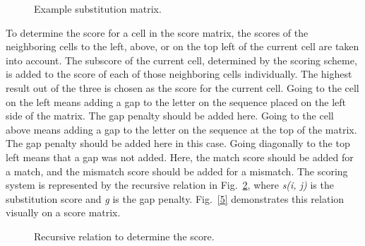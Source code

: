 \documentclass[conference]{IEEEtran}
\begin{document}
\begin{figure}[htbp]
\centerline{}
\caption{Example substitution matrix. \cite{vladimir}}
\label{3}
\end{figure}

To determine the score for a cell in the score matrix, the scores of the neighboring cells to the left, above, or on the top left of the current cell are taken into account. The subscore of the current cell, determined by the scoring scheme, is added to the score of each of those neighboring cells individually. The highest result out of the three is chosen as the score for the current cell. Going to the cell on the left means adding a gap to the letter on the sequence placed on the left side of the matrix. The gap penalty should be added here. Going to the cell above means adding a gap to the letter on the sequence at the top of the matrix. The gap penalty should be added here in this case. Going diagonally to the top left means that a gap was not added. Here, the match score should be added for a match, and the mismatch score should be added for a mismatch. The scoring system is represented by the recursive relation in Fig.~\ref{4}, where \textit{s(i, j)} is the substitution score and \textit{g} is the gap penalty. Fig.~\ref{5} demonstrates this relation visually on a score matrix.

\begin{figure}[htbp]
\centerline{}
\caption{Recursive relation to determine the score. \cite{vladimir}}
\label{4}
\end{figure}
\end{document}

